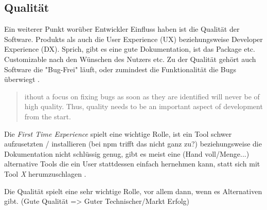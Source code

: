 \subsection{Qualität}

\rawidea
Ein weiterer Punkt worüber Entwickler Einfluss haben ist die Qualität der Software.
Produkts als auch die User Experience (UX) beziehungsweise Developer Experience (DX).
Sprich, gibt es eine gute Dokumentation, ist das Package etc. Customizable nach den Wünschen
des Nutzers etc. Zu der Qualität gehört auch Software die "Bug-Frei" läuft, oder zumindest die Funktionalität
die Bugs überwiegt \cite{bangerthWhatMakesComputational2013}. %

\begin{quote}
    \begin{tcolorbox}[colback=black!5!white,colframe=white!75!black,title=Direkt Zitat aus \cite{bangerthWhatMakesComputational2013} Kapitel 2.1]
        [W]ithout a focus on fixing bugs as soon as they are
        identified will never be of high quality.
        Thus, quality needs to be an important aspect of
        development from the start.
    \end{tcolorbox}
\end{quote}

Die \textit{First Time Experience} spielt eine wichtige Rolle, ist ein Tool
schwer aufzusetzten / installieren (bei npm trifft das nicht ganz zu?)
beziehungsweise die Dokumentation nicht schlüssig genug, gibt es meist eine (Hand voll/Menge...) alternative Tools
die ein User stattdessen einfach hernehmen kann, statt sich mit Tool \textit{X} herumzuschlagen
\cite{bangerthWhatMakesComputational2013}. %


\begin{hypothesis}
    Die Qualität spielt eine sehr wichtige Rolle, vor allem dann, wenn es Alternativen gibt. 
    (Gute Qualität => Guter Technischer/Markt Erfolg) 
\end{hypothesis}